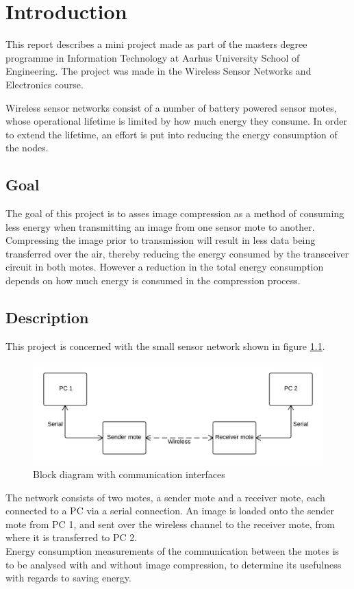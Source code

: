 \chapter{Introduction}
This report describes a mini project made as part of the masters degree programme in Information Technology at Aarhus University School of Engineering. The project was made in the Wireless Sensor Networks and Electronics course.

Wireless sensor networks consist of a number of battery powered sensor motes, whose operational lifetime is limited by how much energy they consume. In order to extend the lifetime, an effort is put into reducing the energy consumption of the nodes.    

\section{Goal}
The goal of this project is to asses image compression as a method of consuming less energy when transmitting an image from one sensor mote to another. Compressing the image prior to transmission will result in less data being transferred over the air, thereby reducing the energy consumed by the transceiver circuit in both motes. However a reduction in the total energy consumption depends on how much energy is consumed in the compression process.

\section{Description}
This project is concerned with the small sensor network shown in figure \ref{fig:blockDia}. 

\begin{figure}[H]
	\centering
	\includegraphics[width=\linewidth, scale = 0.7]{Figures/SimpleBlockDiagram}
	\caption{Block diagram with communication interfaces}
    \label{fig:blockDia}
\end{figure}

The network consists of two motes, a sender mote and a receiver mote, each connected to a PC via a serial connection. An image is loaded onto the sender mote from PC 1, and sent over the wireless channel to the receiver mote, from where it is transferred to PC 2. 
\\Energy consumption measurements of the communication between the motes is to be analysed with and without image compression, to determine its usefulness with regards to saving energy.

